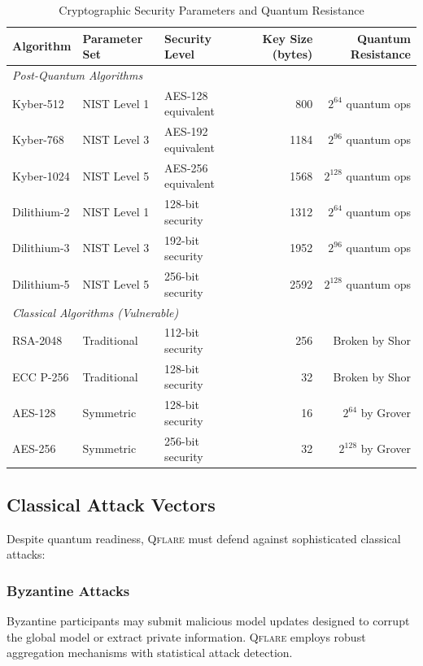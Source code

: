 \documentclass[12pt,a4paper,twoside]{book}
\newcommand{\qflare}{\textsc{Qflare}}
\begin{document}
\begin{table}[htbp]
\centering
\caption{Cryptographic Security Parameters and Quantum Resistance}
\label{tab:crypto-security-params}
\begin{tabular}{@{}lllrr@{}}
\toprule
\textbf{Algorithm} & \textbf{Parameter Set} & \textbf{Security Level} & \textbf{Key Size (bytes)} & \textbf{Quantum Resistance} \\
\midrule
\multicolumn{5}{l}{\textit{Post-Quantum Algorithms}} \\
Kyber-512 & NIST Level 1 & AES-128 equivalent & 800 & $2^{64}$ quantum ops \\
Kyber-768 & NIST Level 3 & AES-192 equivalent & 1184 & $2^{96}$ quantum ops \\
Kyber-1024 & NIST Level 5 & AES-256 equivalent & 1568 & $2^{128}$ quantum ops \\
Dilithium-2 & NIST Level 1 & 128-bit security & 1312 & $2^{64}$ quantum ops \\
Dilithium-3 & NIST Level 3 & 192-bit security & 1952 & $2^{96}$ quantum ops \\
Dilithium-5 & NIST Level 5 & 256-bit security & 2592 & $2^{128}$ quantum ops \\
\midrule
\multicolumn{5}{l}{\textit{Classical Algorithms (Vulnerable)}} \\
RSA-2048 & Traditional & 112-bit security & 256 & Broken by Shor \\
ECC P-256 & Traditional & 128-bit security & 32 & Broken by Shor \\
AES-128 & Symmetric & 128-bit security & 16 & $2^{64}$ by Grover \\
AES-256 & Symmetric & 256-bit security & 32 & $2^{128}$ by Grover \\
\bottomrule
\end{tabular}
\end{table}

\subsection{Classical Attack Vectors}
\label{subsec:classical-attacks}

Despite quantum readiness, \qflare{} must defend against sophisticated classical attacks:

\subsubsection{Byzantine Attacks}
Byzantine participants may submit malicious model updates designed to corrupt the global model or extract private information. \qflare{} employs robust aggregation mechanisms with statistical attack detection.
\end{document}
